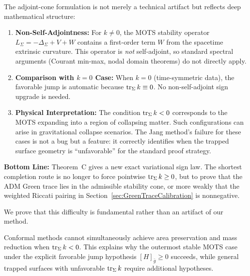\begin{remark}\label{rem:ConjectureCFundamental}
The adjoint-cone formulation is not merely a technical artifact but reflects deep mathematical structure:

\begin{enumerate}
    \item \textbf{Non-Self-Adjointness:} For $k \neq 0$, the MOTS stability operator $L_\Sigma = -\Delta_\Sigma + V + W$ contains a first-order term $W$ from the spacetime extrinsic curvature. This operator is \emph{not} self-adjoint, so standard spectral arguments (Courant min-max, nodal domain theorems) do not directly apply.
    
    \item \textbf{Comparison with $k = 0$ Case:} When $k = 0$ (time-symmetric data), the favorable jump is automatic because $\operatorname{tr}_\Sigma k\equiv0$. No non-self-adjoint sign upgrade is needed.
    
    \item \textbf{Physical Interpretation:} The condition $\operatorname{tr}_\Sigma k < 0$ corresponds to the MOTS expanding into a region of collapsing matter. Such configurations can arise in gravitational collapse scenarios. The Jang method's failure for these cases is not a bug but a feature: it correctly identifies when the trapped surface geometry is ``unfavorable'' for the standard proof strategy.
\end{enumerate}

\textbf{Bottom Line:} Theorem~C gives a new exact variational sign law. The shortest completion route is no longer to force pointwise $\operatorname{tr}_\Sigma k\ge0$, but to prove that the ADM Green trace lies in the admissible stability cone, or more weakly that the weighted Riccati pairing in Section~\ref{sec:GreenTraceCalibration} is nonnegative.
\end{remark}

We prove that this difficulty is fundamental rather than an artifact of our method.

\begin{theorem}\label{thm:intro-obstruction}\label{thm:Obstruction}
Conformal methods cannot simultaneously achieve area preservation and mass reduction when $\operatorname{tr}_\Sigma k < 0$. This explains why the outermost stable MOTS case under the explicit favorable jump hypothesis $[H]_{\bar{g}} \ge 0$ succeeds, while general trapped surfaces with unfavorable $\operatorname{tr}_\Sigma k$ require additional hypotheses.
\end{theorem}

